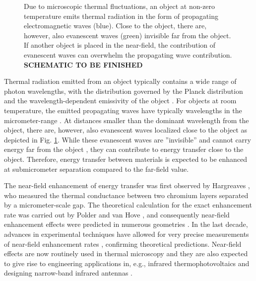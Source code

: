 \begin{figure}
\begin{center}
 \caption{Due to microscopic thermal fluctuations, an object at non-zero temperature emits thermal radiation in the form of propagating electromagnetic waves (blue). Close to the object, there are, however, also evanescent waves (green) invisible far from the object. If another object is placed in the near-field, the contribution of evanescent waves can overwhelm the propagating wave contribution.  \textbf{SCHEMATIC TO BE FINISHED}}
\label{fig:intro_em}
\end{center}
\end{figure}

Thermal radiation emitted from an object typically contains a wide range of photon wavelengths, with the distribution governed by the Planck distribution \cite{planck00a} and the wavelength-dependent emissivity of the object \cite{}. For objects at room temperature, the emitted propagating waves have typically wavelengths in the micrometer-range \cite{}. At distances smaller than the dominant wavelength from the object, there are, however, also evanescent waves localized close to the object as depicted in Fig. \ref{fig:intro_em}. While these evanescent waves are ''invisible'' and cannot carry energy far from the object \cite{}, they can contribute to energy transfer close to the object. Therefore, energy transfer between materials is expected to be enhanced at submicrometer separation compared to the far-field value. 

The near-field enhancement of energy transfer was first observed by Hargreaves \cite{hargreaves69}, who measured the thermal conductance between two chromium layers separated by a micrometer-scale gap. The theoretical calculation for the exact enhancement rate was carried out by Polder and van Hove \cite{polder71}, and consequently near-field enhancement effects were predicted in numerous geometries \cite{loomis94,pendry99,carminati99,shchegrov00,mulet01,volokitin01}. In the last decade, advances in experimental techniques have allowed for very precise measurements of near-field enhancement rates \cite{kittel05,hu08,shen09,ottens11}, confirming theoretical predictions. Near-field effects are now routinely used in thermal microscopy \cite{majumdar99,muller-hirsch99,kittel05,kittel08} and they are also expected to give rise to engineering applications in, e.g., infrared thermophotovoltaics \cite{dimatteo01,narayanaswamy03,laroche06} and designing narrow-band infrared antennas \cite{greffet02}. 

